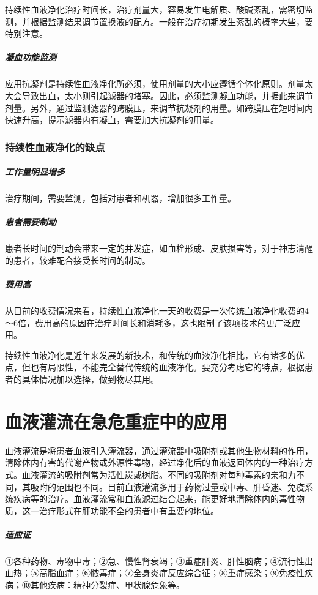 持续性血液净化治疗时间长，治疗剂量大，容易发生电解质、酸碱紊乱，需密切监测，并根据监测结果调节置换液的配方。一般在治疗初期发生紊乱的概率大些，要特别注意。

\subparagraph{凝血功能监测}

应用抗凝剂是持续性血液净化所必须，使用剂量的大小应遵循个体化原则。剂量太大会导致出血，太小则引起滤器的堵塞。因此，必须监测凝血功能，并据此来调节剂量。另外，通过监测滤器的跨膜压，来调节抗凝剂的用量。如跨膜压在短时间内快速升高，提示滤器内有凝血，需要加大抗凝剂的用量。

\subsubsection{持续性血液净化的缺点}

\subparagraph{工作量明显增多}

治疗期间，需要监测，包括对患者和机器，增加很多工作量。

\subparagraph{患者需要制动}

患者长时间的制动会带来一定的并发症，如血栓形成、皮肤损害等，对于神志清醒的患者，较难配合接受长时间的制动。

\subparagraph{费用高}

从目前的收费情况来看，持续性血液净化一天的收费是一次传统血液净化收费的4～6倍，费用高的原因在治疗时间长和消耗多，这也限制了该项技术的更广泛应用。

持续性血液净化是近年来发展的新技术，和传统的血液净化相比，它有诸多的优点，但也有局限性，不能完全替代传统的血液净化。要充分考虑它的特点，根据患者的具体情况加以选择，做到物尽其用。

\protect\hypertarget{text00392.html}{}{}

\section{血液灌流在急危重症中的应用}

血液灌流是将患者血液引入灌流器，通过灌流器中吸附剂或其他生物材料的作用，清除体内有害的代谢产物或外源性毒物，经过净化后的血液返回体内的一种治疗方式。血液灌流的吸附剂常为活性炭或树脂。不同的吸附剂对每种毒素的亲和力不同，其吸附的范围也不同。目前血液灌流多用于药物过量或中毒、肝昏迷、免疫系统疾病等的治疗。血液灌流常和血液滤过结合起来，能更好地清除体内的毒性物质，这一治疗形式在肝功能不全的患者中有重要的地位。

\subparagraph{适应证}

①各种药物、毒物中毒；②急、慢性肾衰竭；③重症肝炎、肝性脑病；④流行性出血热；⑤高脂血症；⑥脓毒症；⑦全身炎症反应综合征；⑧重症感染；⑨免疫性疾病；⑩其他疾病：精神分裂症、甲状腺危象等。

